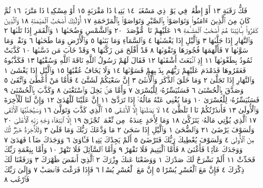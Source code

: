 فَكُّ رَقَبَةٍ ١٣ أَوْ إِطْعَٰمࣱ فِي يَوْمࣲ ذِي مَسْغَبَةࣲ ١٤ يَتِيمࣰا ذَا مَقْرَبَةٍ ١٥
أَوْ مِسْكِينࣰا ذَا مَتْرَبَةࣲ ١٦ ثُمَّ كَانَ مِنَ ٱلَّذِينَ ءَامَنُوا۟ وَتَوَاصَوْا۟
بِٱلصَّبْرِ وَتَوَاصَوْا۟ بِٱلْمَرْحَمَةِ ١٧ أُو۟لَٰٓئِكَ أَصْحَٰبُ ٱلْمَيْمَنَةِ ١٨
وَٱلَّذِينَ كَفَرُوا۟ بِـَٔايَٰتِنَا هُمْ أَصْحَٰبُ ٱلْمَشْـَٔمَةِ ١٩ عَلَيْهِمْ نَارࣱ مُّؤْصَدَةُۢ ٢٠
وَٱلشَّمْسِ وَضُحَىٰهَا ١ وَٱلْقَمَرِ إِذَا تَلَىٰهَا ٢ وَٱلنَّهَارِ إِذَا جَلَّىٰهَا ٣
وَٱلَّيْلِ إِذَا يَغْشَىٰهَا ٤ وَٱلسَّمَآءِ وَمَا بَنَىٰهَا ٥ وَٱلْأَرْضِ
وَمَا طَحَىٰهَا ٦ وَنَفْسࣲ وَمَا سَوَّىٰهَا ٧ فَأَلْهَمَهَا فُجُورَهَا
وَتَقْوَىٰهَا ٨ قَدْ أَفْلَحَ مَن زَكَّىٰهَا ٩ وَقَدْ خَابَ مَن دَسَّىٰهَا ١٠
كَذَّبَتْ ثَمُودُ بِطَغْوَىٰهَآ ١١ إِذِ ٱنۢبَعَثَ أَشْقَىٰهَا ١٢ فَقَالَ لَهُمْ
رَسُولُ ٱللَّهِ نَاقَةَ ٱللَّهِ وَسُقْيَٰهَا ١٣ فَكَذَّبُوهُ فَعَقَرُوهَا فَدَمْدَمَ
عَلَيْهِمْ رَبُّهُم بِذَنۢبِهِمْ فَسَوَّىٰهَا ١٤ وَلَا يَخَافُ عُقْبَٰهَا ١٥
وَٱلَّيْلِ إِذَا يَغْشَىٰ ١ وَٱلنَّهَارِ إِذَا تَجَلَّىٰ ٢ وَمَا خَلَقَ ٱلذَّكَرَ وَٱلْأُنثَىٰٓ ٣
إِنَّ سَعْيَكُمْ لَشَتَّىٰ ٤ فَأَمَّا مَنْ أَعْطَىٰ وَٱتَّقَىٰ ٥ وَصَدَّقَ بِٱلْحُسْنَىٰ ٦
فَسَنُيَسِّرُهُۥ لِلْيُسْرَىٰ ٧ وَأَمَّا مَنۢ بَخِلَ وَٱسْتَغْنَىٰ ٨ وَكَذَّبَ بِٱلْحُسْنَىٰ ٩
فَسَنُيَسِّرُهُۥ لِلْعُسْرَىٰ ١٠ وَمَا يُغْنِي عَنْهُ مَالُهُۥٓ إِذَا تَرَدَّىٰٓ ١١ إِنَّ عَلَيْنَا
لَلْهُدَىٰ ١٢ وَإِنَّ لَنَا لَلْأٓخِرَةَ وَٱلْأُولَىٰ ١٣ فَأَنذَرْتُكُمْ نَارࣰا تَلَظَّىٰ ١٤
لَا يَصْلَىٰهَآ إِلَّا ٱلْأَشْقَى ١٥ ٱلَّذِي كَذَّبَ وَتَوَلَّىٰ ١٦ وَسَيُجَنَّبُهَا
ٱلْأَتْقَى ١٧ ٱلَّذِي يُؤْتِي مَالَهُۥ يَتَزَكَّىٰ ١٨ وَمَا لِأَحَدٍ عِندَهُۥ مِن نِّعْمَةࣲ
تُجْزَىٰٓ ١٩ إِلَّا ٱبْتِغَآءَ وَجْهِ رَبِّهِ ٱلْأَعْلَىٰ ٢٠ وَلَسَوْفَ يَرْضَىٰ ٢١
وَٱلضُّحَىٰ ١ وَٱلَّيْلِ إِذَا سَجَىٰ ٢ مَا وَدَّعَكَ رَبُّكَ وَمَا قَلَىٰ ٣
وَلَلْأٓخِرَةُ خَيْرࣱ لَّكَ مِنَ ٱلْأُولَىٰ ٤ وَلَسَوْفَ يُعْطِيكَ رَبُّكَ
فَتَرْضَىٰٓ ٥ أَلَمْ يَجِدْكَ يَتِيمࣰا فَـَٔاوَىٰ ٦ وَوَجَدَكَ ضَآلࣰّا فَهَدَىٰ ٧
وَوَجَدَكَ عَآئِلࣰا فَأَغْنَىٰ ٨ فَأَمَّا ٱلْيَتِيمَ فَلَا تَقْهَرْ ٩
وَأَمَّا ٱلسَّآئِلَ فَلَا تَنْهَرْ ١٠ وَأَمَّا بِنِعْمَةِ رَبِّكَ فَحَدِّثْ ١١
أَلَمْ نَشْرَحْ لَكَ صَدْرَكَ ١ وَوَضَعْنَا عَنكَ وِزْرَكَ ٢
ٱلَّذِيٓ أَنقَضَ ظَهْرَكَ ٣ وَرَفَعْنَا لَكَ ذِكْرَكَ ٤ فَإِنَّ مَعَ ٱلْعُسْرِ يُسْرًا ٥
إِنَّ مَعَ ٱلْعُسْرِ يُسْرࣰا ٦ فَإِذَا فَرَغْتَ فَٱنصَبْ ٧ وَإِلَىٰ رَبِّكَ فَٱرْغَب ٨
